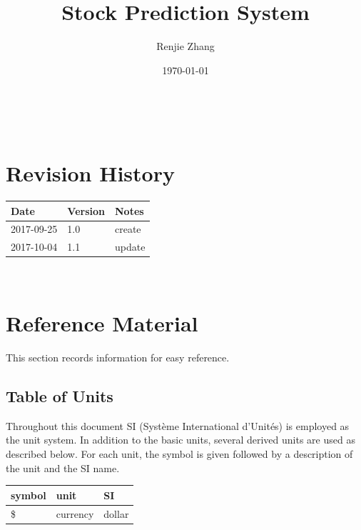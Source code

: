 \documentclass[12pt]{article}
\begin{document}
\title{Stock Prediction System} 
\author{Renjie Zhang}
\date{\today}
	
\maketitle

~\newpage


\section{Revision History}

\begin{tabularx}{\textwidth}{p{3cm}p{2cm}X}
\toprule {\bf Date} & {\bf Version} & {\bf Notes}\\
\midrule
2017-09-25  & 1.0 & create\\
2017-10-04  & 1.1 & update\\
\bottomrule
\end{tabularx}

~\newpage

\section{Reference Material}

This section records information for easy reference.

\subsection{Table of Units}

Throughout this document SI (Syst\`{e}me International d'Unit\'{e}s) is employed
as the unit system.  In addition to the basic units, several derived units are
used as described below.  For each unit, the symbol is given followed by a
description of the unit and the SI name.
~\newline

\renewcommand{\arraystretch}{1.2}
  \noindent \begin{tabular}{l l l} 
    \toprule		
    \textbf{symbol} & \textbf{unit} & \textbf{SI}\\
    \midrule 
    \si{\$} & currency & dollar\\

    \bottomrule
  \end{tabular}
\end{document}
